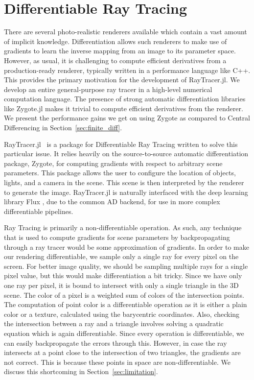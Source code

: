 \documentclass{juliacon}
\begin{document}
\section{Differentiable Ray Tracing}

There are several photo-realistic renderers available which contain a vast amount of implicit knowledge. Differentiation allows such renderers to make use of gradients to learn the inverse mapping from an image to its parameter space. However, as usual, it is challenging to compute efficient derivatives from a production-ready renderer, typically written in a performance language like C++. This provides the primary motivation for the development of RayTracer.jl. We develop an entire general-purpose ray tracer in a high-level numerical computation language. The presence of strong automatic differentiation libraries like Zygote.jl makes it trivial to compute efficient derivatives from the renderer. We present the performance gains we get on using Zygote as compared to Central Differencing in Section~\ref{sec:finite_diff}.

RayTracer.jl~\cite{RayTracer.jl} is a package for Differentiable Ray Tracing written to solve this particular issue. It relies heavily on the source-to-source automatic differentiation package, Zygote, for computing gradients with respect to arbitrary scene parameters. This package allows the user to configure the location of objects, lights, and a camera in the scene. This scene is then interpreted by the renderer to generate the image. RayTracer.jl is naturally interfaced with the deep learning library Flux \cite{Flux.jl-2018}, due to the common AD backend, for use in more complex differentiable pipelines.

Ray Tracing is primarily a non-differentiable operation. As such, any technique that is used to compute gradients for scene parameters by backpropagating through a ray tracer would be some approximation of gradients. In order to make our rendering differentiable, we sample only a single ray for every pixel on the screen. For better image quality, we should be sampling multiple rays for a single pixel value, but this would make differentiation a bit tricky. Since we have only one ray per pixel, it is bound to intersect with only a single triangle in the 3D scene. The color of a pixel is a weighted sum of colors of the intersection points. The computation of point color is a differentiable operation as it is either a plain color or a texture, calculated using the barycentric coordinates. Also, checking the intersection between a ray and a triangle involves solving a quadratic equation which is again differentiable. Since every operation is differentiable, we can easily backpropagate the errors through this. However, in case the ray intersects at a point close to the intersection of two triangles, the gradients are not correct. This is because these points in space are non-differentiable. We discuss this shortcoming in Section~\ref{sec:limitation}.
\end{document}
